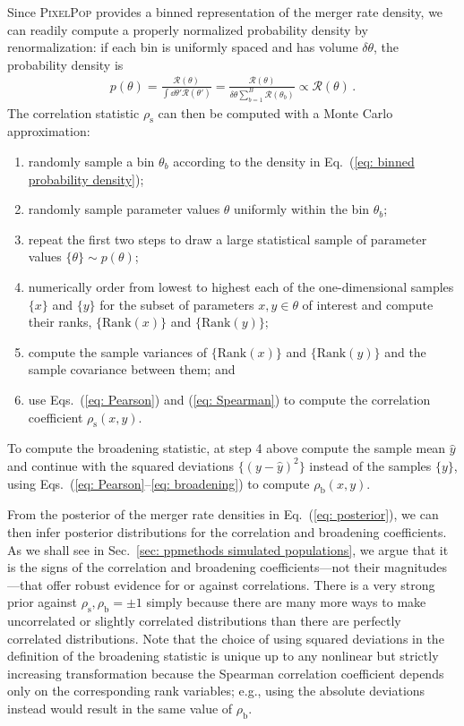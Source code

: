 \begin{refsection}
Since \textsc{PixelPop} provides a binned representation of the merger rate density, we can readily compute a properly normalized probability density by renormalization: if each bin is uniformly spaced and has volume $\delta\theta$, the probability density is
\begin{align}
p(\theta)
=
\frac
{ \mathcal{R}(\theta) }
{ \int \dd{\theta'} \mathcal{R}(\theta') }
=
\frac
{ \mathcal{R}(\theta) }
{ \delta\theta \sum_{b=1}^B \mathcal{R}(\theta_b) }
\propto
\mathcal{R}(\theta)
\, .
\label{eq: binned probability density}
\end{align}
The correlation statistic $\rho_\mathrm{s}$ can then be computed with a Monte Carlo approximation:
\begin{enumerate}
\item randomly sample a bin $\theta_b$ according to the density in Eq.~(\ref{eq: binned probability density});
\item randomly sample parameter values $\theta$ uniformly within the bin $\theta_b$;
\item repeat the first two steps to draw a large statistical sample of parameter values $\{\theta\} \sim p(\theta)$;
\item numerically order from lowest to highest each of the one-dimensional samples $\{x\}$ and $\{y\}$ for the subset of parameters $x,y\in\theta$ of interest and compute their ranks, $\{\mathrm{Rank}(x)\}$ and $\{\mathrm{Rank}(y)\}$;
\item compute the sample variances of $\{\mathrm{Rank}(x)\}$ and $\{\mathrm{Rank}(y)\}$ and the sample covariance between them; and
\item use Eqs.~(\ref{eq: Pearson}) and (\ref{eq: Spearman}) to compute the correlation coefficient $\rho_\mathrm{s}(x,y)$.
\end{enumerate}
To compute the broadening statistic, at step 4 above compute the sample mean $\hat{y}$ and continue with the squared deviations $\{(y-\hat{y})^2\}$ instead of the samples $\{y\}$, using Eqs.~(\ref{eq: Pearson}--\ref{eq: broadening}) to compute $\rho_\mathrm{b}(x,y)$.

From the posterior of the merger rate densities in Eq.~(\ref{eq: posterior}), we can then infer posterior distributions for the correlation and broadening coefficients. As we shall see in Sec.~\ref{sec: ppmethods simulated populations}, we argue that it is the signs of the correlation and broadening coefficients---not their magnitudes---that offer robust evidence for or against correlations. There is a very strong prior against $\rho_\mathrm{s},\rho_\mathrm{b}=\pm1$ simply because there are many more ways to make uncorrelated or slightly correlated distributions than there are perfectly correlated distributions. Note that the choice of using squared deviations in the definition of the broadening statistic is unique up to any nonlinear but strictly increasing transformation because the Spearman correlation coefficient depends only on the corresponding rank variables; e.g., using the absolute deviations instead would result in the same value of $\rho_\mathrm{b}$.


\end{refsection}
